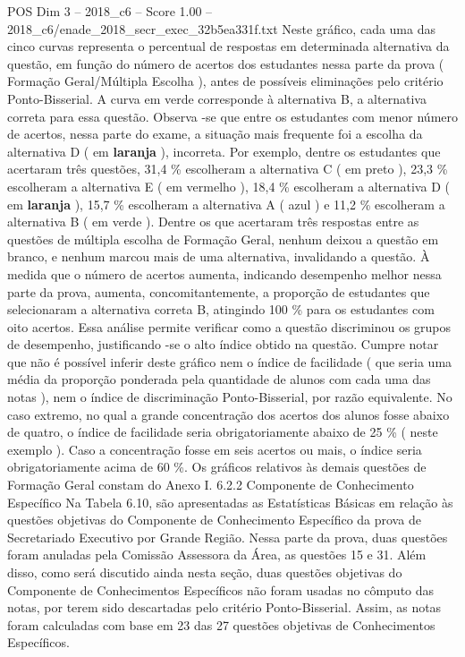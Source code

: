 \begin{textsample}{POS Dim 3 – 2018\_c6 – Score 1.00 – 2018\_c6/enade\_2018\_secr\_exec\_32b5ea331f.txt}
Neste gráfico, cada uma das cinco curvas representa o percentual de respostas em determinada alternativa da questão, em função do número de acertos dos estudantes nessa parte da prova ( Formação Geral/Múltipla Escolha ), antes de possíveis eliminações pelo critério Ponto-Bisserial.
A curva em verde corresponde à alternativa B, a alternativa correta para essa questão.
Observa -se que entre os estudantes com menor número de acertos, nessa parte do exame, a situação mais frequente foi a escolha da alternativa D ( em \textbf{laranja} ), incorreta.
Por exemplo, dentre os estudantes que acertaram três questões, 31,4 \% escolheram a alternativa C ( em preto ), 23,3 \% escolheram a alternativa E ( em vermelho ), 18,4 \% escolheram a alternativa D ( em \textbf{laranja} ), 15,7 \% escolheram a alternativa A ( azul ) e 11,2 \% escolheram a alternativa B ( em verde ).
Dentre os que acertaram três respostas entre as questões de múltipla escolha de Formação Geral, nenhum deixou a questão em branco, e nenhum marcou mais de uma alternativa, invalidando a questão.
À medida que o número de acertos aumenta, indicando desempenho melhor nessa parte da prova, aumenta, concomitantemente, a proporção de estudantes que selecionaram a alternativa correta B, atingindo 100 \% para os estudantes com oito acertos.
Essa análise permite verificar como a questão discriminou os grupos de desempenho, justificando -se o alto índice obtido na questão.
Cumpre notar que não é possível inferir deste gráfico nem o índice de facilidade ( que seria uma média da proporção ponderada pela quantidade de alunos com cada uma das notas ), nem o índice de discriminação Ponto-Bisserial, por razão equivalente.
No caso extremo, no qual a grande concentração dos acertos dos alunos fosse abaixo de quatro, o índice de facilidade seria obrigatoriamente abaixo de 25 \% ( neste exemplo ).
Caso a concentração fosse em seis acertos ou mais, o índice seria obrigatoriamente acima de 60 \%.
Os gráficos relativos às demais questões de Formação Geral constam do Anexo I. 6.2.2 Componente de Conhecimento Específico Na Tabela 6.10, são apresentadas as Estatísticas Básicas em relação às questões objetivas do Componente de Conhecimento Específico da prova de Secretariado Executivo por Grande Região.
Nessa parte da prova, duas questões foram anuladas pela Comissão Assessora da Área, as questões 15 e 31.
Além disso, como será discutido ainda nesta seção, duas questões objetivas do Componente de Conhecimentos Específicos não foram usadas no cômputo das notas, por terem sido descartadas pelo critério Ponto-Bisserial.
Assim, as notas foram calculadas com base em 23 das 27 questões objetivas de Conhecimentos Específicos.

\end{textsample}
